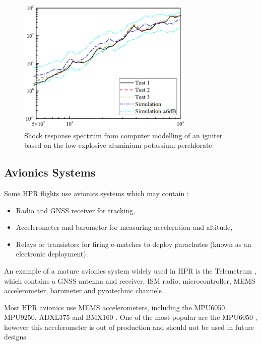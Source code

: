 \documentclass{report}
\begin{document}
\begin{figure}[H]
  \centering
  \includegraphics[width=0.75\textwidth]{images/deflagration.png}
  \caption{Shock response spectrum from computer modelling of an igniter based on the low explosive aluminium potassium perchlorate \cite{wang2023numerical}}
  \label{fig:lowsrs}
\end{figure}

\subsection{Avionics Systems}

Some HPR flights use avionics systems which may contain \cite{canepa2005modern,telaak2023designing}:

\begin{itemize}
  \item Radio and GNSS receiver for tracking,
  \item Accelerometer and barometer for measuring acceleration and altitude,
  \item Relays or transistors for firing e-matches to deploy parachutes (known as an electronic deployment).
\end{itemize}

An example of a mature avionics system widely used in HPR is the Telemetrum \cite{telemetrum,telaak2023designing}, which contains a GNSS antenna and receiver, ISM radio, microcontroller, MEMS accelerometer, barometer and pyrotechnic channels \cite{telemetrum}.

Most HPR avionics use MEMS accelerometers, including the MPU6050, MPU9250, ADXL375 and BMX160 \cite{telaak2023designing}. One of the most popular are the MPU6050 \cite{telaak2023designing,moschidis2022arduino}, however this accelerometer is out of production and should not be used in future designs.
\end{document}
